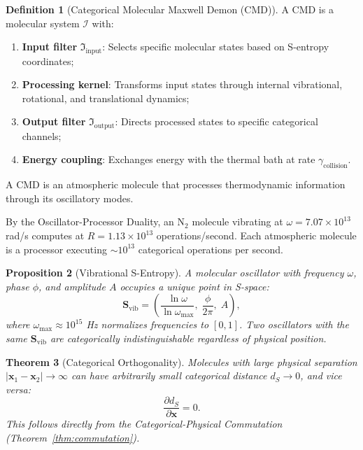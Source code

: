 \documentclass[twocolumn,10pt]{article}
\newtheorem{theorem}{Theorem}[section]
\newtheorem{proposition}[theorem]{Proposition}
\theoremstyle{definition}
\newtheorem{definition}[theorem]{Definition}
\newcommand{\Sentropy}{\mathbf{S}}
\begin{document}
\begin{definition}[Categorical Molecular Maxwell Demon (CMD)]\label{def:CMD}
A CMD is a molecular system $\mathscr{I}$ with:
\begin{enumerate}[nosep]
    \item \textbf{Input filter} $\mathfrak{I}_{\mathrm{input}}$: Selects specific molecular states based on S-entropy coordinates;
    \item \textbf{Processing kernel}: Transforms input states through internal vibrational, rotational, and translational dynamics;
    \item \textbf{Output filter} $\mathfrak{I}_{\mathrm{output}}$: Directs processed states to specific categorical channels;
    \item \textbf{Energy coupling}: Exchanges energy with the thermal bath at rate $\gamma_{\mathrm{collision}}$.
\end{enumerate}
A CMD is an atmospheric molecule that processes thermodynamic information through its oscillatory modes.
\end{definition}

By the Oscillator-Processor Duality, an $\mathrm{N}_2$ molecule vibrating at $\omega = 7.07 \times 10^{13}$ rad/s computes at $R = 1.13 \times 10^{13}$ operations/second. Each atmospheric molecule is a processor executing $\sim 10^{13}$ categorical operations per second.

\begin{proposition}[Vibrational S-Entropy]\label{prop:vib_sentropy}
A molecular oscillator with frequency $\omega$, phase $\phi$, and amplitude $A$ occupies a unique point in S-space:
\begin{equation}\label{eq:vib_sentropy}
    \Sentropy_{\mathrm{vib}} = \left(\frac{\ln\omega}{\ln\omega_{\max}},\; \frac{\phi}{2\pi},\; A\right),
\end{equation}
where $\omega_{\max} \approx 10^{15}$ Hz normalizes frequencies to $[0,1]$. Two oscillators with the same $\Sentropy_{\mathrm{vib}}$ are categorically indistinguishable regardless of physical position.
\end{proposition}

\begin{theorem}[Categorical Orthogonality]\label{thm:cat_orth}
Molecules with large physical separation $|\mathbf{x}_1 - \mathbf{x}_2| \to \infty$ can have arbitrarily small categorical distance $d_S \to 0$, and vice versa:
\begin{equation}\label{eq:cat_orth}
    \frac{\partial d_S}{\partial\mathbf{x}} = 0.
\end{equation}
This follows directly from the Categorical-Physical Commutation (Theorem~\ref{thm:commutation}).
\end{theorem}
\end{document}
